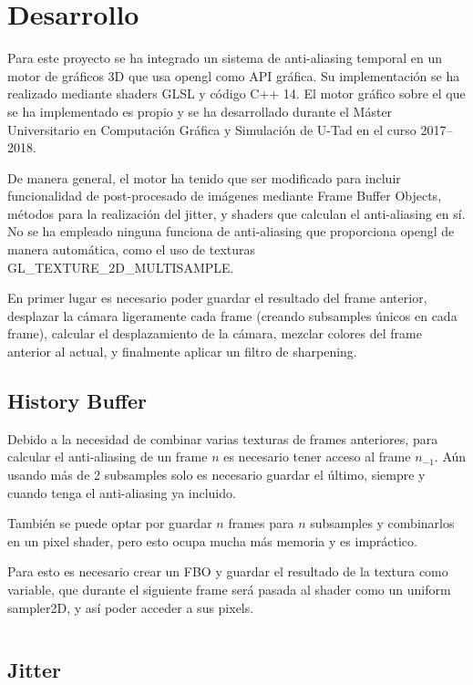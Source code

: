 \documentclass[withindex, glossary]{cam-thesis}
\begin{document}
\chapter{Desarrollo}

Para este proyecto se ha integrado un sistema de anti-aliasing temporal en un motor de gráficos 3D que usa \Gls{opengl} como API gráfica. Su implementación se ha realizado mediante shaders GLSL y código C++ 14. El motor gráfico sobre el que se ha implementado es propio y se ha desarrollado durante el Máster Universitario en Computación Gráfica y Simulación de U-Tad en el curso 2017--2018.

De manera general, el motor ha tenido que ser modificado para incluir funcionalidad de post-procesado de imágenes mediante Frame Buffer Objects, métodos para la realización del jitter, y shaders que calculan el anti-aliasing en sí. No se ha empleado ninguna funciona de anti-aliasing que proporciona \Gls{opengl} de manera automática, como el uso de texturas GL\_TEXTURE\_2D\_MULTISAMPLE\@.

En primer lugar es necesario poder guardar el resultado del frame anterior, desplazar la cámara ligeramente cada frame (creando subsamples únicos en cada frame), calcular el desplazamiento de la cámara, mezclar colores del frame anterior al actual, y finalmente aplicar un filtro de sharpening.

\section{History Buffer}

Debido a la necesidad de combinar varias texturas de frames anteriores, para calcular el anti-aliasing de un frame $n$ es necesario tener acceso al frame $n_{-1}$. Aún usando más de 2 subsamples solo es necesario guardar el último, siempre y cuando tenga el anti-aliasing ya incluido.

También se puede optar por guardar $n$ frames para $n$ subsamples y combinarlos en un pixel shader, pero esto ocupa mucha más memoria y es impráctico.

Para esto es necesario crear un FBO y guardar el resultado de la textura como variable, que durante el siguiente frame será pasada al shader como un uniform sampler2D, y así poder acceder a sus pixels.

\begin{verbatim}
\end{verbatim}

\section{Jitter}
\end{document}
